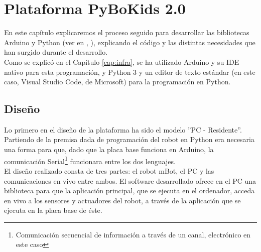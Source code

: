 \chapter{Plataforma PyBoKids 2.0}
\label{cap:PyBoKids}
En este capítulo explicaremos el proceso seguido para desarrollar las bibliotecas Arduino y Python (ver en \cite{arduinolenguaje}, \cite{PythonRef}), explicando el código y las distintas necesidades que han surgido durante el desarrollo. \\
Como se explicó en el Capítulo \ref{cap:infra}, se ha utilizado Arduino  y su IDE nativo para esta programación, y Python 3 y un editor de texto estándar (en este caso, Visual Studio Code, de Microsoft) para la programación en Python. 

\section{Diseño}\label{sec:diseño}
Lo primero en el diseño de la plataforma ha sido el modelo ''PC - Residente''. Partiendo de la premisa dada de programación del robot en Python era necesaria una forma para que, dado que la placa base funciona en Arduino, la comunicación Serial\footnote{Comunicación secuencial de información a través de un canal, electrónico en este caso} funcionara entre los dos lenguajes. \\
El diseño realizado consta de tres partes: el robot mBot, el PC y las comunicaciones en vivo entre ambos. El software desarrollado ofrece en el PC una biblioteca para que la aplicación principal, que se ejecuta en el ordenador, acceda en vivo a los sensores y actuadores del robot, a través de la aplicación que se ejecuta en la placa base de éste.\\

